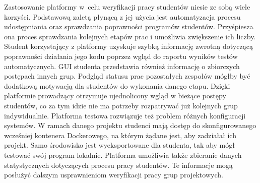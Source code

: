 Zastosowanie platformy w~celu weryfikacji pracy studentów niesie ze sobą wiele korzyści.
Podstawową zaletą płynącą z jej użycia jest automatyzacja procesu udostępniania oraz sprawdzania poprawności programów studentów.
Przyśpiesza ona proces sprawdzania kolejnych etapów prac i umożliwia zwiększenie ich liczby.
Student korzystający z platformy uzyskuje szybką informację zwrotną dotyczącą poprawności działania jego kodu poprzez wgląd do raportu wyników testów automatycznych.
GUI studenta przedstawia również informację o zbiorczych postępach innych grup.
Podgląd statusu prac pozostałych zespołów mógłby być dodatkową motywacją dla studentów do wykonania danego etapu.
Dzięki platformie prowadzący otrzymuje ujednolicony wgląd w bieżące postępy studentów, co za tym idzie nie ma potrzeby rozpatrywać już kolejnych grup indywidualnie.
Platforma testowa rozwiązuje też problem różnych konfiguracji systemów.
W ramach danego projektu studenci mają dostęp do skonfigurowanego wcześniej kontenera Dockerowego, na którym żądane jest, aby zadziałał ich projekt.
Samo środowisko jest wyeksportowane dla studenta, tak aby mógł testować swój program lokalnie.
Platforma umożliwia także zbieranie danych statystycznych dotyczących procesu pracy studentów.
Te informacje mogą posłużyć dalszym usprawnieniom weryfikacji pracy grup projektowych.
